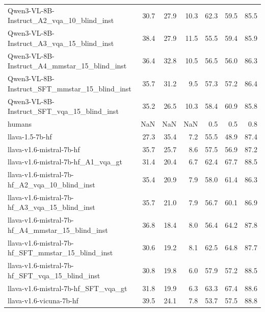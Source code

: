 \begin{tabular}{lrrrrrr}
Qwen3-VL-8B-Instruct_A2_vqa_10_blind_inst & 30.7 & 27.9 & 10.3 & 62.3 & 59.5 & 85.5 \\
Qwen3-VL-8B-Instruct_A3_vqa_15_blind_inst & 38.4 & 27.9 & 11.5 & 55.5 & 59.4 & 85.9 \\
Qwen3-VL-8B-Instruct_A4_mmstar_15_blind_inst & 36.4 & 32.8 & 10.5 & 56.5 & 56.0 & 86.3 \\
Qwen3-VL-8B-Instruct_SFT_mmstar_15_blind_inst & 35.7 & 31.2 & 9.5 & 57.3 & 57.2 & 86.4 \\
Qwen3-VL-8B-Instruct_SFT_vqa_15_blind_inst & 35.2 & 26.5 & 10.3 & 58.4 & 60.9 & 85.8 \\
humans & NaN & NaN & NaN & 0.5 & 0.5 & 0.8 \\
llava-1.5-7b-hf & 27.3 & 35.4 & 7.2 & 55.5 & 48.9 & 87.4 \\
llava-v1.6-mistral-7b-hf & 35.7 & 25.7 & 8.6 & 57.5 & 56.9 & 87.2 \\
llava-v1.6-mistral-7b-hf_A1_vqa_gt & 31.4 & 20.4 & 6.7 & 62.4 & 67.7 & 88.5 \\
llava-v1.6-mistral-7b-hf_A2_vqa_10_blind_inst & 35.4 & 20.9 & 7.9 & 58.0 & 61.4 & 86.3 \\
llava-v1.6-mistral-7b-hf_A3_vqa_15_blind_inst & 35.7 & 21.0 & 7.9 & 56.7 & 60.1 & 86.9 \\
llava-v1.6-mistral-7b-hf_A4_mmstar_15_blind_inst & 36.8 & 18.4 & 8.0 & 56.4 & 64.2 & 87.8 \\
llava-v1.6-mistral-7b-hf_SFT_mmstar_15_blind_inst & 30.6 & 19.2 & 8.1 & 62.5 & 64.8 & 87.7 \\
llava-v1.6-mistral-7b-hf_SFT_vqa_15_blind_inst & 30.8 & 19.8 & 6.0 & 57.9 & 57.2 & 88.5 \\
llava-v1.6-mistral-7b-hf_SFT_vqa_gt & 31.8 & 19.9 & 6.3 & 63.3 & 67.4 & 88.6 \\
llava-v1.6-vicuna-7b-hf & 39.5 & 24.1 & 7.8 & 53.7 & 57.5 & 88.8 \\
\bottomrule
\end{tabular}

